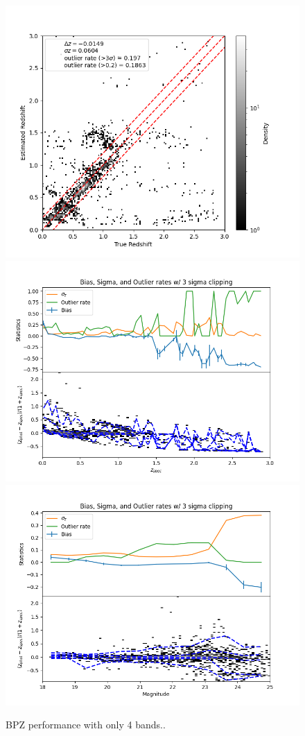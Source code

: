 \begin{figure}
    \centering
    \includegraphics[width=0.33\linewidth]{figures/zestimate_v_ztrue_hist2d_bpz_4.png}
    \includegraphics[width=0.33\linewidth]{figures/biweight_stats_v_redshift_bpz_4.png}
    \includegraphics[width=0.33\linewidth]{figures/biweight_stats_v_mag_bpz_4.png}
    \caption{BPZ performance with only 4 bands..}
    \label{fig:perf_bpz_4}
\end{figure}

